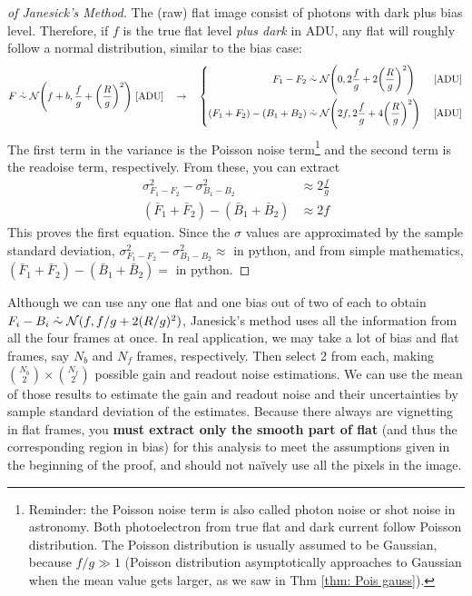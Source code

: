 \begin{proof}[of Janesick's Method]
The (raw) flat image consist of photons with dark plus bias level. Therefore, if $ f $ is the true flat level \emph{plus dark} in ADU, any flat will roughly follow a normal distribution, similar to the bias case: 
\begin{equation*}
  F \mathrel{\dot{\sim}} \mathcal{N} \qty( f + b, \frac{f}{g} + \qty(\frac{R}{g})^2 ) ~\mathrm{[ADU]}
  \quad \rightarrow \quad  
  \left \{
  \begin{aligned}
    F_1 - F_2 &\mathrel{\dot{\sim}} 
      \mathcal{N} \qty( 0, 2\frac{f}{g} + 2 \qty(\frac{R}{g})^2 ) &~\mathrm{[ADU]}\\
    (F_1 + F_2) - (B_1 + B_2) & \mathrel{\dot{\sim}} 
      \mathcal{N} \qty(2f, 2 \frac{f}{g} + 4 \qty( \frac{R}{g} )^2) &~\mathrm{[ADU]}
  \end{aligned}
  \right .
\end{equation*}
The first term in the variance is the Poisson noise term\footnote{Reminder: the Poisson noise term is also called photon noise or shot noise in astronomy. Both photoelectron from true flat and dark current follow Poisson distribution. The Poisson distribution is usually assumed to be Gaussian, because $ f/g \gg 1 $ (Poisson distribution asymptotically approaches to Gaussian when the mean value gets larger, as we saw in Thm \ref{thm: Pois gauss}).} and the second term is the readoise term, respectively. From these, you can extract
\begin{align*}
  \sigma^2_{F_1 - F_2} - \sigma^2_{B_1 - B_2} 
    &\approx 2\frac{f}{g}\\
  (\bar{F}_1 + \bar{F}_2) - (\bar{B}_1 + \bar{B}_2)
   &\approx 2f
\end{align*}
This proves the first equation. Since the $ \sigma $ values are approximated by the sample standard deviation, $ \sigma^2_{F_1 - F_2} - \sigma^2_{B_1 - B_2} \approx $  in python, and from simple mathematics, $ (\bar{F}_1 + \bar{F}_2) - (\bar{B}_1 + \bar{B}_2) = $  in python.
\end{proof}

Although we can use any one flat and one bias out of two of each to obtain $ F_i - B_i \mathrel{\dot{\sim}} \mathcal{N} (f, f/g + 2(R/g)^2) $, Janesick's method uses all the information from all the four frames at once. In real application, we may take a lot of bias and flat frames, say $ N_b $ and $ N_f $ frames, respectively. Then select 2 from each, making $ \binom{N_b}{2} \times \binom{N_f}{2} $ possible gain and readout noise estimations. We can use the mean of those results to estimate the gain and readout noise and their uncertainties by sample standard deviation of the estimates. Because there always are vignetting in flat frames, you \textbf{must extract only the smooth part of flat} (and thus the corresponding region in bias) for this analysis to meet the assumptions given in the beginning of the proof, and should not na\"{i}vely use all the pixels in the image.

